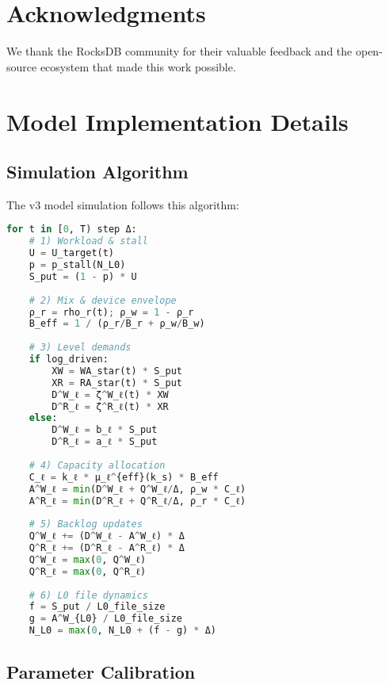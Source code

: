 \documentclass[11pt,twocolumn]{article}
\begin{document}
\section*{Acknowledgments}

We thank the RocksDB community for their valuable feedback and the open-source ecosystem that made this work possible.




\appendix

\section{Model Implementation Details}

\subsection{Simulation Algorithm}

The v3 model simulation follows this algorithm:

\begin{lstlisting}[language=Python]
for t in [0, T) step Δ:
    # 1) Workload & stall
    U = U_target(t)
    p = p_stall(N_L0)
    S_put = (1 - p) * U
    
    # 2) Mix & device envelope
    ρ_r = rho_r(t); ρ_w = 1 - ρ_r
    B_eff = 1 / (ρ_r/B_r + ρ_w/B_w)
    
    # 3) Level demands
    if log_driven:
        XW = WA_star(t) * S_put
        XR = RA_star(t) * S_put
        D^W_ℓ = ζ^W_ℓ(t) * XW
        D^R_ℓ = ζ^R_ℓ(t) * XR
    else:
        D^W_ℓ = b_ℓ * S_put
        D^R_ℓ = a_ℓ * S_put
    
    # 4) Capacity allocation
    C_ℓ = k_ℓ * μ_ℓ^{eff}(k_s) * B_eff
    A^W_ℓ = min(D^W_ℓ + Q^W_ℓ/Δ, ρ_w * C_ℓ)
    A^R_ℓ = min(D^R_ℓ + Q^R_ℓ/Δ, ρ_r * C_ℓ)
    
    # 5) Backlog updates
    Q^W_ℓ += (D^W_ℓ - A^W_ℓ) * Δ
    Q^R_ℓ += (D^R_ℓ - A^R_ℓ) * Δ
    Q^W_ℓ = max(0, Q^W_ℓ)
    Q^R_ℓ = max(0, Q^R_ℓ)
    
    # 6) L0 file dynamics
    f = S_put / L0_file_size
    g = A^W_{L0} / L0_file_size
    N_L0 = max(0, N_L0 + (f - g) * Δ)
\end{lstlisting}

\subsection{Parameter Calibration}
\end{document}
